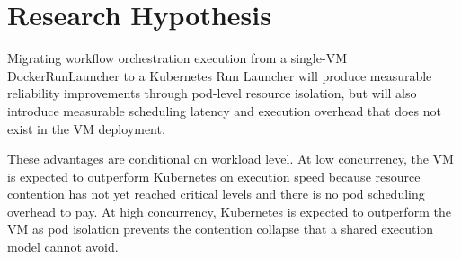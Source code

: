 
\section{Research Hypothesis}
\label{sec:hypothesis}

Migrating workflow orchestration execution from a single-VM DockerRunLauncher to a Kubernetes Run Launcher will produce measurable reliability improvements through pod-level resource isolation, but will also introduce measurable scheduling latency and execution overhead that does not exist in the VM deployment.

These advantages are conditional on workload level. At low concurrency, the VM is expected to outperform Kubernetes on execution speed because resource contention has not yet reached critical levels and there is no pod scheduling overhead to pay. At high concurrency, Kubernetes is expected to outperform the VM as pod isolation prevents the contention collapse that a shared execution model cannot avoid.
